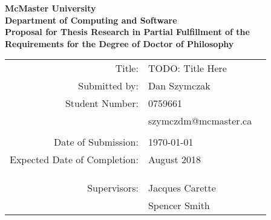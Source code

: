 \documentclass{article}
\begin{document}

\pagestyle{plain}
\thispagestyle{empty}
\def\title{\large \sc TODO: Title Here}
\def\author{\sc Dan Szymczak}
\def\studnum{0759661}
\def\email{\sc szymczdm@mcmaster.ca}

\def\degree{Doctor of Philosophy}
\def\deptname{Computing and Software}
\def\supJ{Jacques Carette}
\def\supS{Spencer Smith}

\def\submissiondate{\today}
\def\completiondate{August 2018}

\begin{center}
{\Large \bf 
   McMaster University
\\ Department of \deptname \\}
\vspace{.25in}
{\Large \bf
   Proposal for Thesis Research in Partial Fulfillment
 of the Requirements for the Degree of \degree \\}
\end{center}

\vspace{.5in}

\begin{tabular}{rlc}
   {\large \sc Title:}                       & \multicolumn{2}{l}{\title}
\\ {\sc Submitted by:}
                            & \author  & \\
    {\sc Student Number:}   & \studnum & \\
                            & \email   & \\ 
			    &	       &
\\ { \sc Date of Submission:}          & \multicolumn{2}{l}{\submissiondate}
\\ {\small \sc Expected Date of Completion:} & \multicolumn{2}{l}{\completiondate}
\\ & \\ & \\
\\ {\large \sc Supervisors:}                 & {\large {\supJ}}
\\ & {\large {\supS}}
\end{tabular}

\cleardoublepage
{}
\begin{abstract}

TODO: ABSTRACT

\end{abstract}
\pagebreak
\tableofcontents
\pagebreak
{}
\end{document}
